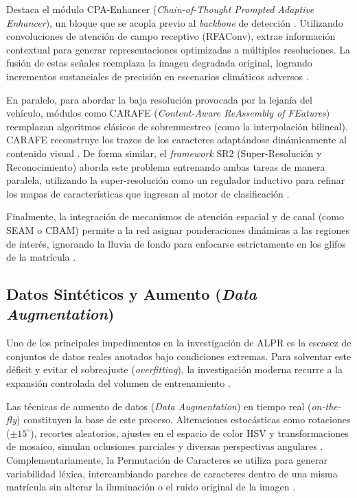 Destaca el módulo CPA-Enhancer (\textit{Chain-of-Thought Prompted Adaptive Enhancer}), un bloque 
que se acopla previo al \textit{backbone} de detección \parencite{xiongLicensePlateRecognition2026}. 
Utilizando convoluciones de atención de campo receptivo (RFAConv), extrae información 
contextual para generar representaciones optimizadas a múltiples resoluciones. La fusión de 
estas señales reemplaza la imagen degradada original, logrando incrementos sustanciales de 
precisión en escenarios climáticos adversos \parencite{xiongLicensePlateRecognition2026}.

En paralelo, para abordar la baja resolución provocada por la lejanía del vehículo, 
módulos como CARAFE (\textit{Content-Aware ReAssembly of FEatures}) reemplazan algoritmos 
clásicos de sobremuestreo (como la interpolación bilineal). CARAFE reconstruye los trazos 
de los caracteres adaptándose dinámicamente al contenido visual 
\parencite{xiongLicensePlateRecognition2026}. De forma similar, el \textit{framework} SR2 
(Super-Resolución y Reconocimiento) aborda este problema entrenando ambas tareas de manera 
paralela, utilizando la super-resolución como un regulador inductivo para refinar los 
mapas de características que ingresan al motor de clasificación 
\parencite{schirrmacherBenchmarkingProbabilisticDeep2023}.

Finalmente, la integración de mecanismos de atención espacial y de canal (como SEAM o CBAM) 
permite a la red asignar ponderaciones dinámicas a las regiones de interés, ignorando 
la lluvia de fondo para enfocarse estrictamente en los glifos de la matrícula 
\parencite{xiongLicensePlateRecognition2026, xuDeepLearningAlgorithms2026c}.

\subsection{Datos Sintéticos y Aumento (\textit{Data Augmentation})}

Uno de los principales impedimentos en la investigación de ALPR es la escasez de conjuntos de 
datos reales anotados bajo condiciones extremas. Para solventar este déficit y evitar el 
sobreajuste (\textit{overfitting}), la investigación moderna recurre a la expansión controlada 
del volumen de entrenamiento \parencite{larocaAdvancingMultinationalLicense2025, meesadAdvancedDeepLearning2025a}.

Las técnicas de aumento de datos (\textit{Data Augmentation}) en tiempo real (\textit{on-the-fly}) 
constituyen la base de este proceso. Alteraciones estocásticas como rotaciones ($\pm15^\circ$), 
recortes aleatorios, ajustes en el espacio de color HSV y transformaciones de mosaico, 
simulan oclusiones parciales y diversas perspectivas angulares 
\parencite{buleuDeepLearningBasedSystem2025a, vargooraniLicensePlateDetection2024}. 
Complementariamente, la Permutación de Caracteres se utiliza para generar variabilidad 
léxica, intercambiando parches de caracteres dentro de una misma matrícula sin alterar 
la iluminación o el ruido original de la imagen \parencite{larocaAdvancingMultinationalLicense2025}.

